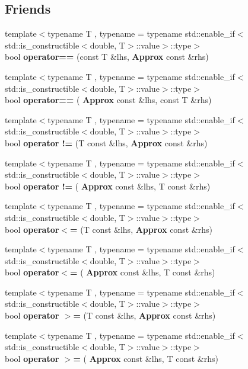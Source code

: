 \subsection*{Friends}
\begin{DoxyCompactItemize}
\item 
{\footnotesize template$<$typename T , typename  = typename std\+::enable\+\_\+if$<$std\+::is\+\_\+constructible$<$double, T$>$\+::value$>$\+::type$>$ }\\bool \textbf{ operator==} (const T \&lhs, \textbf{ Approx} const \&rhs)
\item 
{\footnotesize template$<$typename T , typename  = typename std\+::enable\+\_\+if$<$std\+::is\+\_\+constructible$<$double, T$>$\+::value$>$\+::type$>$ }\\bool \textbf{ operator==} (\textbf{ Approx} const \&lhs, const T \&rhs)
\item 
{\footnotesize template$<$typename T , typename  = typename std\+::enable\+\_\+if$<$std\+::is\+\_\+constructible$<$double, T$>$\+::value$>$\+::type$>$ }\\bool \textbf{ operator !=} (T const \&lhs, \textbf{ Approx} const \&rhs)
\item 
{\footnotesize template$<$typename T , typename  = typename std\+::enable\+\_\+if$<$std\+::is\+\_\+constructible$<$double, T$>$\+::value$>$\+::type$>$ }\\bool \textbf{ operator !=} (\textbf{ Approx} const \&lhs, T const \&rhs)
\item 
{\footnotesize template$<$typename T , typename  = typename std\+::enable\+\_\+if$<$std\+::is\+\_\+constructible$<$double, T$>$\+::value$>$\+::type$>$ }\\bool \textbf{ operator$<$=} (T const \&lhs, \textbf{ Approx} const \&rhs)
\item 
{\footnotesize template$<$typename T , typename  = typename std\+::enable\+\_\+if$<$std\+::is\+\_\+constructible$<$double, T$>$\+::value$>$\+::type$>$ }\\bool \textbf{ operator$<$=} (\textbf{ Approx} const \&lhs, T const \&rhs)
\item 
{\footnotesize template$<$typename T , typename  = typename std\+::enable\+\_\+if$<$std\+::is\+\_\+constructible$<$double, T$>$\+::value$>$\+::type$>$ }\\bool \textbf{ operator $>$=} (T const \&lhs, \textbf{ Approx} const \&rhs)
\item 
{\footnotesize template$<$typename T , typename  = typename std\+::enable\+\_\+if$<$std\+::is\+\_\+constructible$<$double, T$>$\+::value$>$\+::type$>$ }\\bool \textbf{ operator $>$=} (\textbf{ Approx} const \&lhs, T const \&rhs)
\end{DoxyCompactItemize}


